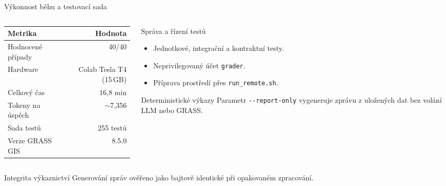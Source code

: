 \documentclass[aspectratio=169,10pt]{beamer}
\begin{document}
\begin{frame}[t]{Výkonnost běhu a testovací sada}
  \small
  \begin{columns}[T,onlytextwidth]
    \begin{column}{0.50\textwidth}
      \begin{table}
        \centering
        \begin{tabular}{@{}lr@{}}
          \toprule
          \textbf{Metrika} & \textbf{Hodnota} \\
          \midrule
          Hodnocené případy & 40/40 \\
          Hardware & Colab Tesla T4 (15\,GB) \\
          Celkový čas & 16,8 min \\
          Tokeny na úspěch & $\sim$7{,}356 \\
          Sada testů & 255 testů \\
          Verze GRASS GIS & 8.5.0 \\
          \bottomrule
        \end{tabular}
      \end{table}
    \end{column}

    \begin{column}{0.48\textwidth}
      \begin{block}{Správa a řízení testů}
        \begin{itemize}
          \item Jednotkové, integrační a kontraktní testy.
          \item Neprivilegovaný účet \texttt{grader}.
          \item Příprava prostředí přes \texttt{run\_remote.sh}.
        \end{itemize}
      \end{block}

      \begin{block}{Deterministické výkazy}
        Parametr \texttt{-{}-report-only} vygeneruje zprávu z uložených dat bez
        volání LLM nebo GRASS.
      \end{block}
    \end{column}
  \end{columns}

  \begin{exampleblock}{Integrita výkaznictví}
    Generování zpráv ověřeno jako bajtově identické při opakovaném zpracování.
  \end{exampleblock}
\end{frame}
\end{document}
